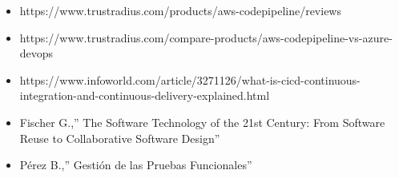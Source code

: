 \documentclass[12pt,a4paper,oneside]{book}
\begin{document}
\begin{enumerate}
\begin{itemize}
			\item https://www.trustradius.com/products/aws-codepipeline/reviews
			
			\item https://www.trustradius.com/compare-products/aws-codepipeline-vs-azure-devops
			
			\item https://www.infoworld.com/article/3271126/what-is-cicd-continuous-integration-and-continuous-delivery-explained.html
			 
			 \item Fischer G.,” The Software Technology of the 21st Century: From Software Reuse to Collaborative Software Design”
			 
			 \item Pérez B.,” Gestión de las Pruebas Funcionales” 
			 
			\end{itemize}
		
	\end{enumerate}
	
	
	
\end{document}
